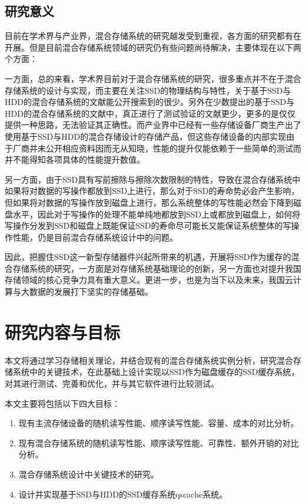 \subsection{研究意义}

目前在学术界与产业界，混合存储系统的研究越发受到重视，各方面的研究都有在开展。但是目前混合存储系统领域的研究仍有些问题尚待解决，主要体现在以下两个方面：

一方面，总的来看，学术界目前对于混合存储系统的研究，很多重点并不在于混合存储系统的设计与实现，而主要在关注SSD的物理结构与特性，关于基于SSD与HDD的混合存储系统的文献\cite{guerra2011cost, kim2011hybridstore, 杨濮源2012一种时间敏感的, 陈震37基于磁盘和固态硬盘的混合存储系统研究综述}能公开搜索到的很少。另外在少数提出的基于SSD与HDD的混合存储系统的文献中，真正进行了测试验证的文献更少，更多的是仅仅提供一种思路，无法验证其正确性。而产业界中已经有一些存储设备厂商生产出了使用基于SSD与HDD的混合存储设计的存储产品，但这些存储设备的内部实现由于厂商并未公开相应资料因而无从知晓，性能的提升仅能依赖于一些简单的测试而并不能得知各项具体的性能提升数值。

另一方面，由于SSD具有写前擦除与擦除次数限制的特性，导致在混合存储系统中如果将对数据的写操作都放到SSD上进行，那么对于SSD的寿命势必会产生影响，但如果将对数据的写操作放到磁盘上进行，那么系统整体的写性能必然会下降到磁盘水平，因此对于写操作的处理不能单纯地都放到SSD上或都放到磁盘上，如何将写操作分发到SSD和磁盘上既能保证SSD的寿命尽可能长又能保证系统整体的写操作性能，仍是目前混合存储系统设计中的问题。

因此，把握住SSD这一新型存储器件兴起所带来的机遇，开展将SSD作为缓存的混合存储系统的研究，一方面是对存储系统基础理论的创新，另一方面也对提升我国存储领域的核心竞争力具有重大意义。更进一步，也是为当下以及未来，我国云计算与大数据的发展打下坚实的存储基础。

\section{研究内容与目标}

本文将通过学习存储相关理论，并结合现有的混合存储系统实例分析，研究混合存储系统中的关键技术，在此基础上设计实现以SSD作为磁盘缓存的SSD缓存系统，对其进行测试、完善和优化，并与其它软件进行比较测试。

本文主要将包括以下四大目标：
\begin{enumerate}[wide]
    \item 现有主流存储设备的随机读写性能、顺序读写性能、容量、成本的对比分析。
    \item 现有混合存储系统的随机读写性能、顺序读写性能、可靠性、额外开销的对比分析。
    \item 混合存储系统设计中关键技术的研究。
    \item 设计并实现基于SSD与HDD的SSD缓存系统qscache系统。
\end{enumerate}

